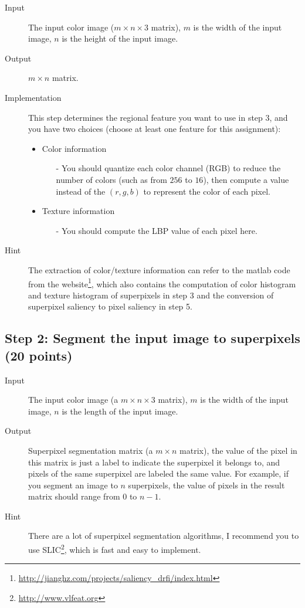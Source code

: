 \documentclass[12pt]{article}
\begin{document}
\begin{description}
\item[Input] The input color image ($m \times n \times 3$ matrix), $m$ is the width of the input image, $n$ is the height of the input image.
\item[Output] $m \times n$ matrix. 
\item[Implementation] This step determines the regional feature you want to use in step 3, and you have two choices (choose at least one feature for this assignment):
\begin{itemize}
\item Color information
\begin{itemize}
\item[-] You should quantize each color channel (RGB) to reduce the number of colors (such as from $256$ to $16$), then compute a value instead of the $(r,g,b)$ to represent the color of each pixel. 
\end{itemize}
\item Texture information
\begin{itemize}
\item[-] You should compute the LBP value of each pixel here.  
\end{itemize}
\end{itemize}
\item[Hint] The extraction of color/texture information can refer to the matlab code from the website\footnote{\url{http://jianghz.com/projects/saliency_drfi/index.html}}, which also contains the computation of color histogram and texture histogram of superpixels in step 3 and the conversion of superpixel saliency to pixel saliency in step 5.
\end{description}

\subsection{Step 2: Segment the input image to superpixels (20 points)}

\begin{description}
\item[Input] The input color image (a $m \times n \times 3$ matrix), $m$ is the width of the input image, $n$ is the length of the input image. 
\item[Output]  Superpixel segmentation matrix (a $m \times n$ matrix), the value of the pixel in this matrix is just a label to indicate the superpixel it belongs to, and pixels of the same superpixel are labeled the same value. For example, if you segment an image to $n$ superpixels, the value of pixels in the result matrix should range from $0$ to $n-1$. 
\item[Hint] There are a lot of superpixel segmentation algorithms, I recommend you to use SLIC\footnote{\url{http://www.vlfeat.org}}, which is fast and easy to implement.
\end{description}
\end{document}
